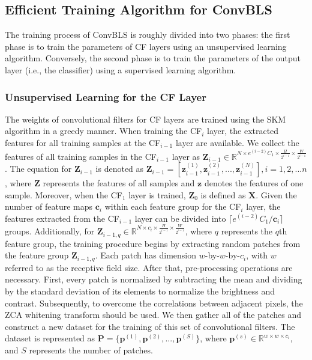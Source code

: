 \documentclass[lettersize,journal]{IEEEtran}
\begin{document}
\subsection{Efficient Training Algorithm for ConvBLS}
The training process of ConvBLS is roughly divided into two phases: the first phase is to train the parameters of CF layers using an unsupervised learning algorithm. Conversely, the second phase is to train the parameters of the output layer (i.e., the classifier) using a supervised learning algorithm.

\subsubsection{Unsupervised Learning for the CF Layer}
The weights of convolutional filters for CF layers are trained using the SKM algorithm in a greedy manner. When training the CF$_i$ layer, the extracted features for all training samples at the CF$_{i-1}$ layer are available. We collect the features of all training samples in the CF$_{i-1}$ layer as $\bm{Z}_{i-1}\in \mathbb{R}^{N \times e^{(i-2)}C_{1} \times \frac{H}{2^{i-1}} \times \frac{W}{2^{i-1}}}$. The equation for $\bm{Z}_{i-1}$ is denoted as
$\bm{Z}_{i-1}=[\bm{z}_{i-1}^{(1)},\bm{z}_{i-1}^{(2)},...,\bm{z}_{i-1}^{(N)}], i=1,2,...n$
, where $\bm{Z}$ represents the features of all samples and $\bm{z}$ denotes the features of one sample. Moreover, when the CF$_1$ layer is trained, $\bm{Z}_0$ is defined as $\bm{X}$. Given the number of feature maps $\bm{c}_i$ within each feature group for the CF$_i$ layer, the features extracted from the CF$_{i-1}$ layer can be divided into $\lceil e^{(i-2)}C_{1}/{\bm{c}_i} \rceil$ groups. Additionally, for $\bm{Z}_{i-1,q} \in \mathbb{R}^{N \times c_i \times \frac{H}{2^{i-1}} \times \frac{W}{2^{i-1}}}$, where $q$ represents the $q$th feature group, the training procedure begins by extracting random patches from the feature group $\bm{Z}_{i-1,q}$. Each patch has dimension $w$-by-$w$-by-$c_i$, with $w$ referred to as the receptive field size. After that, pre-processing operations are necessary. First, every patch is normalized by subtracting the mean and dividing by the standard deviation of its elements to normalize the brightness and contrast. 
Subsequently, to overcome the correlations between adjacent pixels, the ZCA whitening transform\cite{ranzato2010factored} should be used. 
We then gather all of the patches and construct a new dataset for the training of this set of convolutional filters. The dataset is represented as $\bm{P}=\{\bm{p}^{(1)},\bm{p}^{(2)},...,\bm{p}^{(S)}\}$, 
where $\bm{p}^{(s)} \in \mathbb{R}^{w \times w \times c_i}$, and $S$ represents the number of patches.
\end{document}
